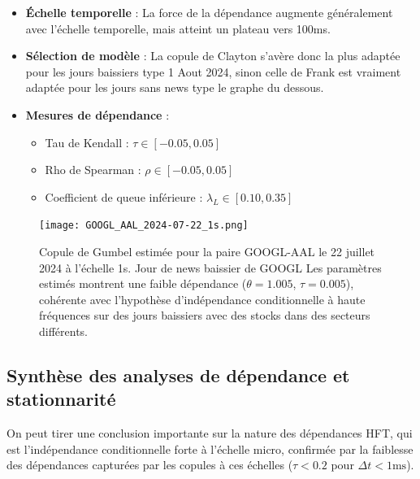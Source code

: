 \documentclass[10pt,a4paper]{article}
\theoremstyle{definition}
\theoremstyle{remark}
\begin{document}
\begin{itemize}
    \begin{itemize}
    \item \textbf{Échelle temporelle} : La force de la dépendance augmente généralement avec l'échelle temporelle, mais atteint un plateau vers 100ms.
    
    \item \textbf{Sélection de modèle} : La copule de Clayton s'avère donc la plus adaptée pour les jours baissiers type 1 Aout 2024, sinon celle de Frank est vraiment adaptée pour les jours sans news type le graphe du dessous.
    
    \item \textbf{Mesures de dépendance} :
    \begin{itemize}
        \item Tau de Kendall : $\tau \in [-0.05, 0.05]$
        \item Rho de Spearman : $\rho \in [-0.05, 0.05]$
        \item Coefficient de queue inférieure : $\lambda_L \in [0.10, 0.35]$
    \end{itemize}
    \end{itemize}
    
\begin{figure}[h!]
\centering
    \texttt{[image: GOOGL\_AAL\_2024-07-22\_1s.png]}
    \caption{Copule de Gumbel estimée pour la paire GOOGL-AAL le 22 juillet 2024 à l'échelle 1s. Jour de news baissier de GOOGL Les paramètres estimés montrent une faible dépendance ($\theta = 1.005$, $\tau = 0.005$), cohérente avec l'hypothèse d'indépendance conditionnelle à haute fréquences sur des jours baissiers avec des stocks dans des secteurs différents.}
    \label{fig:copula_example_app1}
\end{figure}




\subsection{Synthèse des analyses de dépendance et stationnarité}

On peut tirer une conclusion importante sur la nature des dépendances HFT, qui est l'indépendance conditionnelle forte à l'échelle micro, confirmée par la faiblesse des dépendances capturées par les copules à ces échelles ($\tau < 0.2$ pour $\Delta t < 1\text{ms}$).
    

\end{itemize}
\end{document}
